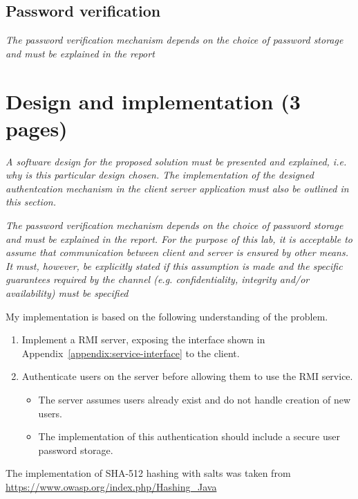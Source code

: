 \documentclass[12pt]{article}
\begin{document}
\subsection{Password verification}
\label{sub:Password verification}

\textit{The password verification mechanism depends on the choice of password storage and must be explained in the report}
\newpage

\section{Design and implementation (3 pages)}
\label{sec:Design and implementation}

\textit{A software design for the proposed solution must be presented and explained, i.e. why is this particular design chosen. The implementation of the designed authentcation mechanism in the client server application must also be outlined in this section.}

\textit{The password verification mechanism depends on the choice of password storage and must be explained in the report.
For the purpose of this lab, it is acceptable to assume that communication between client and server is ensured by other means. It must, however, be explicitly stated if this assumption is made and the specific guarantees required by the channel (e.g. confidentiality, integrity and/or availability) must be specified}

My implementation is based on the following understanding of the problem.

\begin{enumerate}
    \item Implement a RMI server, exposing the interface shown in Appendix~\ref{appendix:service-interface} to the client.
    \item Authenticate users on the server before allowing them to use the RMI service.
    \begin{itemize}
        \item The server assumes users already exist and do not handle creation of new users.
        \item The implementation of this authentication should include a secure user password storage.
    \end{itemize}
\end{enumerate}

The implementation of SHA-512 hashing with salts was taken from \url{https://www.owasp.org/index.php/Hashing_Java}
\end{document}
